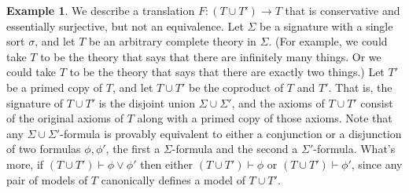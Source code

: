 \documentclass[12pt]{article}
\theoremstyle{definition}
\newtheorem{example}[prop]{Example}
\theoremstyle{remark}
\newcommand{\3}{\mathcal}
\begin{document}
\begin{example} \label{nope} We describe a translation
  $F:(T\cup T')\to T$ that is conservative and essentially surjective,
  but not an equivalence. Let $\Sigma$ be a signature with a single
  sort $\sigma$, and let $T$ be an arbitrary complete theory in
  $\Sigma$. (For example, we could take $T$ to be the theory that says
  that there are infinitely many things. Or we could take $T$ to be
  the theory that says that there are exactly two things.)  Let $T'$
  be a primed copy of $T$, and let $T\cup T'$ be the coproduct of $T$
  and $T'$. That is, the signature of $T\cup T'$ is the disjoint union
  $\Sigma \cup \Sigma '$, and the axioms of $T\cup T'$ consist of the
  original axioms of $T$ along with a primed copy of those
  axioms. Note that any $\Sigma\cup\Sigma '$-formula is provably
  equivalent to either a conjunction or a disjunction of two formulas
  $\phi ,\phi '$, the first a $\Sigma$-formula and the second a
  $\Sigma '$-formula. What's more, if
  $(T\cup T')\vdash \phi \vee \phi '$ then either
  $(T\cup T')\vdash\phi$ or $(T\cup T')\vdash \phi '$, since any pair
  of models of $T$ canonically defines a model of $T\cup T'$.


\end{example}
\end{document}
